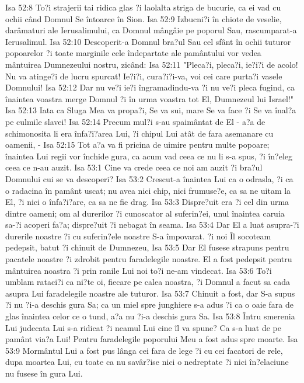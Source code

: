 Isa 52:8  To?i strajerii tai ridica glas ?i laolalta striga de bucurie, ca ei vad cu ochii când Domnul Se întoarce în Sion.
Isa 52:9  Izbucni?i în chiote de veselie, darâmaturi ale Ierusalimului, ca Domnul mângâie pe poporul Sau, rascumparat-a Ierusalimul.
Isa 52:10  Descoperit-a Domnul bra?ul Sau cel sfânt în ochii tuturor popoarelor ?i toate marginile cele îndepartate ale pamântului vor vedea mântuirea Dumnezeului nostru, zicând:
Isa 52:11  "Pleca?i, pleca?i, ie?i?i de acolo! Nu va atinge?i de lucru spurcat! Ie?i?i, cura?i?i-va, voi cei care purta?i vasele Domnului!
Isa 52:12  Dar nu ve?i ie?i îngramadindu-va ?i nu ve?i pleca fugind, ca înaintea voastra merge Domnul ?i în urma voastra tot El, Dumnezeul lui Israel!"
Isa 52:13  Iata ca Sluga Mea va propa?i, Se va sui, mare Se va face ?i Se va înal?a pe culmile slavei!
Isa 52:14  Precum mul?i s-au spaimântat de El - a?a de schimonosita li era înfa?i?area Lui, ?i chipul Lui atât de fara asemanare cu oamenii, -
Isa 52:15  Tot a?a va fi pricina de uimire pentru multe popoare; înaintea Lui regii vor închide gura, ca acum vad ceea ce nu li s-a spus, ?i în?eleg ceea ce n-au auzit.
Isa 53:1  Cine va crede ceea ce noi am auzit ?i bra?ul Domnului cui se va descoperi?
Isa 53:2  Crescut-a înaintea Lui ca o odrasla, ?i ca o radacina în pamânt uscat; nu avea nici chip, nici frumuse?e, ca sa ne uitam la El, ?i nici o înfa?i?are, ca sa ne fie drag.
Isa 53:3  Dispre?uit era ?i cel din urma dintre oameni; om al durerilor ?i cunoscator al suferin?ei, unul înaintea caruia sa-?i acoperi fa?a; dispre?uit ?i nebagat în seama.
Isa 53:4  Dar El a luat asupra-?i durerile noastre ?i cu suferin?ele noastre S-a împovarat. ?i noi Îl socoteam pedepsit, batut ?i chinuit de Dumnezeu,
Isa 53:5  Dar El fusese strapuns pentru pacatele noastre ?i zdrobit pentru faradelegile noastre. El a fost pedepsit pentru mântuirea noastra ?i prin ranile Lui noi to?i ne-am vindecat.
Isa 53:6  To?i umblam rataci?i ca ni?te oi, fiecare pe calea noastra, ?i Domnul a facut sa cada asupra Lui faradelegile noastre ale tuturor.
Isa 53:7  Chinuit a fost, dar S-a supus ?i nu ?i-a deschis gura Sa; ca un miel spre junghiere s-a adus ?i ca o oaie fara de glas înaintea celor ce o tund, a?a nu ?i-a deschis gura Sa.
Isa 53:8  Întru smerenia Lui judecata Lui s-a ridicat ?i neamul Lui cine îl va spune? Ca s-a luat de pe pamânt via?a Lui! Pentru faradelegile poporului Meu a fost adus spre moarte.
Isa 53:9  Mormântul Lui a fost pus lânga cei fara de lege ?i cu cei facatori de rele, dupa moartea Lui, cu toate ca nu savâr?ise nici o nedreptate ?i nici în?elaciune nu fusese în gura Lui.

